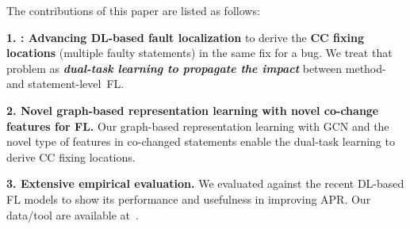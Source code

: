 


The contributions of this paper are listed as follows:

{\bf 1. {\tool}: Advancing DL-based fault localization} to derive the
{\bf CC fixing locations} (multiple faulty statements) in the same fix
for a bug. We treat that problem as {\bf {\em dual-task learning to
    propagate the impact}} between method- and statement-level~FL.


{\bf 2. Novel graph-based representation learning with novel co-change
  features for FL.} Our graph-based representation learning with GCN
and the novel type of features in co-changed statements enable the
dual-task learning to derive CC fixing locations.

{\bf 3. Extensive empirical evaluation.} We evaluated {\tool} against
the recent DL-based FL models to show its performance and
usefulness in improving APR. Our data/tool are available
at~\cite{FixLocator2022}.

